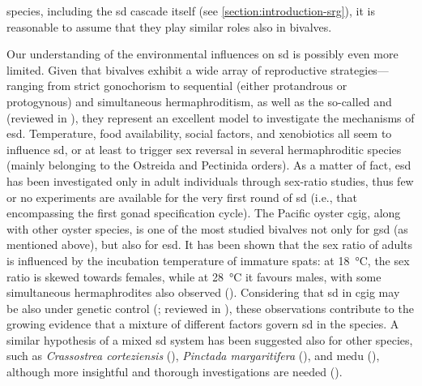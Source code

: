 species, including the \gls{sd} cascade itself (see \cref{section:introduction-srg}), it is reasonable to assume that they play similar roles also in bivalves.

Our understanding of the environmental influences on \gls{sd} is possibly even more limited. Given that bivalves exhibit a wide array of reproductive strategies—ranging from strict gonochorism to sequential (either protandrous or protogynous) and simultaneous hermaphroditism, as well as the so-called  and  (reviewed in ), they represent an excellent model to investigate the mechanisms of \gls{esd}. Temperature, food availability, social factors, and xenobiotics all seem to influence \gls{sd}, or at least to trigger sex reversal in several hermaphroditic species (mainly belonging to the Ostreida and Pectinida orders). As a matter of fact, \gls{esd} has been investigated only in adult individuals through sex-ratio studies, thus few or no experiments are available for the very first round of \gls{sd} (i.e., that encompassing the first gonad specification cycle). The Pacific oyster \gls{cgig}, along with other oyster species, is one of the most studied bivalves not only for \gls{gsd} (as mentioned above), but also for \gls{esd}. It has been shown that the sex ratio of adults is influenced by the incubation temperature of immature spats: at \qty{18}{\degreeCelsius}, the sex ratio is skewed towards females, while at \qty{28}{\degreeCelsius} it favours males, with some simultaneous hermaphrodites also observed (). Considering that \gls{sd} in \gls{cgig} may be also under genetic control (; reviewed in ), these observations contribute to the growing evidence that a mixture of different factors govern \gls{sd} in the species. A similar hypothesis of a mixed \gls{sd} system has been suggested also for other species, such as \textit{Crassostrea corteziensis} (), \textit{Pinctada margaritifera} (), and \gls{medu} (), although more insightful and thorough investigations are needed ().

